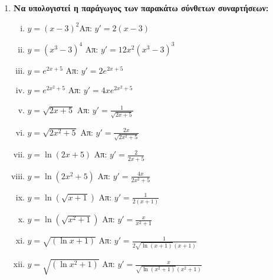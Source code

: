 \begin{enumerate}
  \item {\bfseries Να υπολογιστεί η παράγωγος των παρακάτω σύνθετων συναρτήσεων:}
    \begin{enumerate}[i)]
      \item $ y=(x-3)^2$\hfill Απ: $y'=2(x-3)$
      \item $ y=(x^{3}-3)^{4} $ \hfill Απ: $ y'=12x^{2}(x^{3}-3)^{3} $ 
      \item $ y=e^{2x+5} $ \hfill Απ: $ y'=2 e^{2x+5} $ 
      \item $ y=e^{2x^{2}+5} $ \hfill Απ: $ y'=4xe^{2x^{2}+5} $ 
      \item $ y= \sqrt{2x+5} $ \hfill Απ: $ y'= \frac{1}{\sqrt{2x+5}} $ 
      \item $ y= \sqrt{2x^{2}+5} $ \hfill Απ: $ y'= \frac{2x}{\sqrt{2x^{2}+5}} $ 
      \item $ y= \ln{(2x+5)} $ \hfill Απ: $ y'= \frac{2}{2x+5} $ 
      \item $ y= \ln{(2x^{2}+5)} $ \hfill Απ: $ y'= \frac{4x}{2x^{2}+5} $ 
      \item $ y= \ln{(\sqrt{x+1})} $ \hfill Απ: $ y'= \frac{1}{2(x+1)} $ 
      \item $ y= \ln{(\sqrt{x^{2}+1})} $ \hfill Απ: $ y'= \frac{x}{x^{2}+1} $ 
      \item $ y= \sqrt{(\ln{x+1})} $ 
      \hfill Απ: $ y'= \frac{1}{2 \sqrt{\ln{(x+1)}}(x+1)} $ 
    \item $ y= \sqrt{(\ln{x^{2}+1})} $ 
      \hfill Απ: $ y'= \frac{x}{\sqrt{\ln{(x^{2}+1)}}(x^{2}+1)} $ 
    \end{enumerate}
\end{enumerate}










